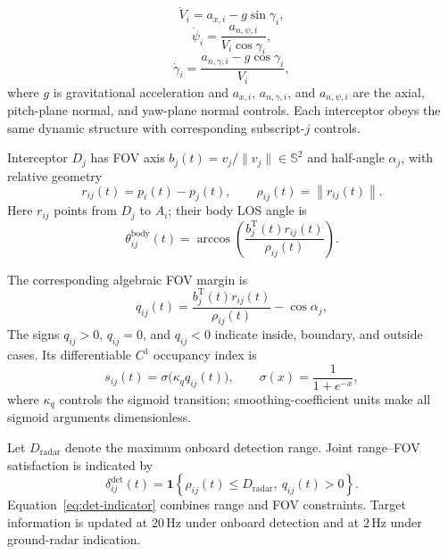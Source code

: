 \documentclass[unbranded]{cja}
\begin{document}
\begin{equation}
\dot V_i
=a_{x,i}-g\sin\gamma_i,
\label{eq:dyn-V}
\end{equation}
\begin{equation}
\dot\psi_i
=\frac{a_{n,\psi,i}}{V_i\cos\gamma_i},
\label{eq:dyn-psi}
\end{equation}
\begin{equation}
\dot\gamma_i
=\frac{a_{n,\gamma,i}-g\cos\gamma_i}{V_i},
\label{eq:dyn-gamma}
\end{equation}
where $g$ is gravitational acceleration and $a_{x,i}$, $a_{n,\gamma,i}$, and $a_{n,\psi,i}$ are the axial, pitch-plane normal, and yaw-plane normal controls. Each interceptor obeys the same dynamic structure with corresponding subscript-$j$ controls.

Interceptor $D_j$ has FOV axis $b_j(t)=v_j/\|v_j\|\in\mathbb S^2$ and half-angle $\alpha_j$, with relative geometry
\begin{equation}
r_{ij}(t)=p_i(t)-p_j(t),\qquad
\rho_{ij}(t)=\left\|r_{ij}(t)\right\|.
\end{equation}
Here $r_{ij}$ points from $D_j$ to $A_i$; their body LOS angle is
\begin{equation}
\theta_{ij}^{\mathrm{body}}(t)
=
\arccos
\left(
\frac{b_j^{\mathrm T}(t)r_{ij}(t)}
{\rho_{ij}(t)}
\right).
\end{equation}

The corresponding algebraic FOV margin is
\begin{equation}
q_{ij}(t)
=
\frac{b_j^{\mathrm T}(t)r_{ij}(t)}
{\rho_{ij}(t)}
-\cos\alpha_j ,
\label{eq:qij-def}
\end{equation}
The signs $q_{ij}>0$, $q_{ij}=0$, and $q_{ij}<0$ indicate inside, boundary, and outside cases. Its differentiable $C^1$ occupancy index is
\begin{equation}
s_{ij}(t)
=
\sigma\!\bigl(\kappa_q q_{ij}(t)\bigr),\qquad
\sigma(x)=\frac{1}{1+e^{-x}},
\label{eq:sij-def}
\end{equation}
where $\kappa_q$ controls the sigmoid transition; smoothing-coefficient units make all sigmoid arguments dimensionless.

Let $D_{\mathrm{radar}}$ denote the maximum onboard detection range. Joint range--FOV satisfaction is indicated by
\begin{equation}
\delta_{ij}^{\mathrm{det}}(t)
=
\mathbf{1}
\left\{
\rho_{ij}(t)\le D_{\mathrm{radar}},\
q_{ij}(t)>0
\right\}.
\label{eq:det-indicator}
\end{equation}
Equation~\eqref{eq:det-indicator} combines range and FOV constraints. Target information is updated at $20\,\mathrm{Hz}$ under onboard detection and at $2\,\mathrm{Hz}$ under ground-radar indication.
\end{document}
